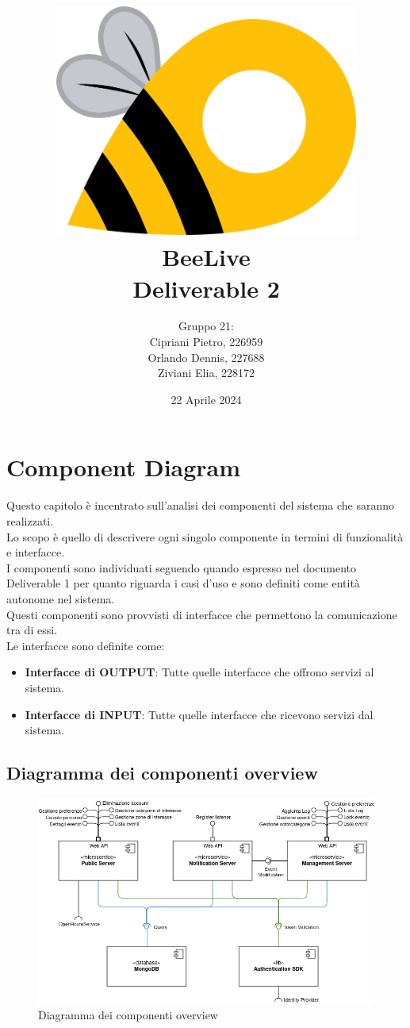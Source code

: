 \documentclass{article}
\title{\includegraphics[width=0.75\textwidth]{Images/BeeLive-Logo.png}\\\vspace{100pt}
\LARGE{\textbf{BeeLive\\Deliverable 2}}}
\author{Gruppo 21:\\
Cipriani Pietro, 226959\\
Orlando Dennis, 227688\\
Ziviani Elia, 228172}
\date{22 Aprile 2024}
\begin{document}
\maketitle
\thispagestyle{firstpage} %
\clearpage

\pagestyle{nonplain} %

\renewcommand{\contentsname}{Indice}
\tableofcontents

\clearpage

\section{Component Diagram}

Questo capitolo è incentrato sull'analisi dei componenti del sistema che saranno realizzati.\\
Lo scopo è quello di descrivere ogni singolo componente in termini di funzionalità e interfacce.\\

I componenti sono individuati seguendo quando espresso nel documento Deliverable 1 per quanto riguarda i casi d'uso e sono definiti come entità autonome nel sistema.\\
Questi componenti sono provvisti di interfacce che permettono la comunicazione tra di essi.\\
Le interfacce sono definite come:
\begin{itemize}
    \item \textbf{Interfacce di OUTPUT}: Tutte quelle interfacce che offrono servizi al sistema.
    \item \textbf{Interfacce di INPUT}: Tutte quelle interfacce che ricevono servizi dal sistema.
\end{itemize} 

\subsection{Diagramma dei componenti overview}

\begin{figure}[htbp]
    \centering
    \includegraphics[width=1\textwidth]{Images/ComponentDiagram_overview.png}
    \caption{Diagramma dei componenti overview}
    \label{fig:component-diagram-overview}
\end{figure}
\end{document}
